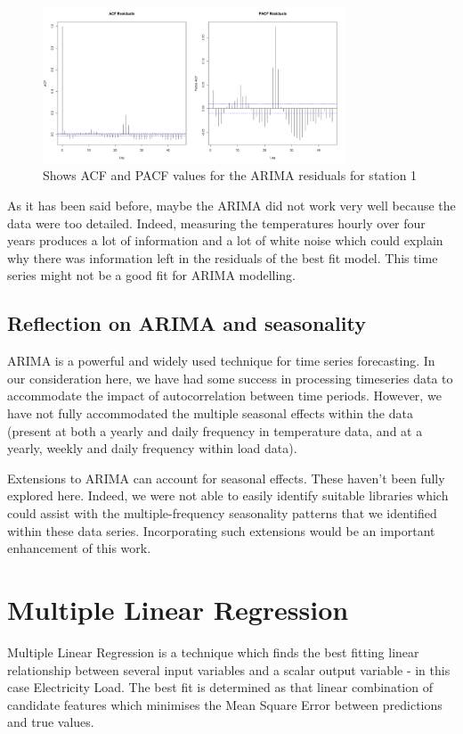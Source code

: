 \documentclass{article} %
\begin{document}
\begin{figure}[H]
  \centering
    \includegraphics[width=0.80\textwidth]{ACFandPACFTempArimaResults}
  \caption{Shows ACF and PACF values for the ARIMA residuals for station 1 }
\end{figure}

As it has been said before, maybe the ARIMA did not work very well because the data were too detailed. Indeed, measuring the temperatures hourly over four years produces a lot of information and a lot of white noise which could explain why there was information left in the residuals of the best fit model. This time series might not be a good fit for ARIMA modelling.

\subsection{Reflection on ARIMA and seasonality}
ARIMA is a powerful and widely used technique for time series forecasting.  In our consideration here, we have had some success in processing timeseries data to accommodate the impact of autocorrelation between time periods.  However, we have not fully accommodated the multiple seasonal effects within the data (present at both a yearly and daily frequency in temperature data, and at a yearly, weekly and daily frequency within load data).

Extensions to ARIMA can account for seasonal effects.  These haven't been fully explored here.  Indeed, we were not able to easily identify suitable libraries which could assist with the multiple-frequency seasonality patterns that we identified within these data series.  Incorporating such extensions would be an important enhancement of this work.

\section*{Multiple Linear Regression}
Multiple Linear Regression is a technique which finds the best fitting linear relationship between several input variables and a scalar output variable - in this case Electricity Load.  The best fit is determined as that linear combination of candidate features which minimises the Mean Square Error between predictions and true values.
\end{document}
